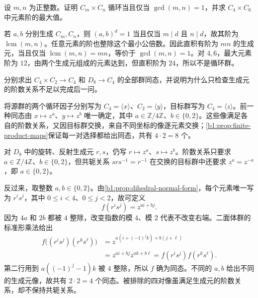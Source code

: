 \begin{exercise}\label{b1:ex:06-2}
	设 \(m,n\) 为正整数。证明 \(C_m\times C_n\) 循环当且仅当 \(\gcd(m,n)=1\)，并求 \(C_4\times C_6\) 中元素阶的最大值。
\end{exercise}
\begin{solution}
	若 \(a,b\) 分别生成 \(C_m,C_n\)，则 \((a,b)^d=1\) 当且仅当 \(m\mid d\) 且 \(n\mid d\)，故其阶为 \(\operatorname{lcm}(m,n)\)。任意元素的阶也整除这个最小公倍数。因此直积有阶为 \(mn\) 的生成元，当且仅当 \(\operatorname{lcm}(m,n)=mn\)，等价于 \(\gcd(m,n)=1\)。对 \(4,6\)，最大元素阶为 \(12\)，由两个生成元组成的元素达到，但直积阶为 \(24\)，所以不是循环群。
\end{solution}

\begin{exercise}\label{b1:ex:06-product-semidirect-homs}
	分别求出 \(C_4\times C_2\rightarrow C_4\) 和 \(D_8\rightarrow C_4\) 的全部群同态，并说明为什么只检查生成元的阶数关系不足以完成后一问。
\end{exercise}
\begin{solution}
	将源群的两个循环因子分别写为 \(C_4=\langle x\rangle\)、\(C_2=\langle y\rangle\)，目标群写为 \(C_4=\langle z\rangle\)。前一种同态由 \(x\mapsto z^a\)、\(y\mapsto z^b\) 唯一确定，其中 \(a\in\mathbb Z/4\mathbb Z\)、\(b\in\{0,2\}\)。这些像满足各自的阶数关系，又因目标群交换，来自不同坐标的像逐元素交换；\cref{b1:prop:finite-product-maps}保证每一对选择都给出同态，共有 \(4\cdot2=8\) 个。

	对 \(D_8\) 中的旋转、反射生成元 \(r,s\)，仍写 \(r\mapsto z^a\)、\(s\mapsto z^b\)。阶数关系只要求 \(a\in\mathbb Z/4\mathbb Z\)、\(b\in\{0,2\}\)，但共轭关系 \(srs^{-1}=r^{-1}\) 在交换的目标群中还要求 \(z^a=z^{-a}\)，即 \(a\in\{0,2\}\)。

	反过来，取整数 \(a,b\in\{0,2\}\)。由\cref{b1:prop:dihedral-normal-form}，每个元素唯一写为 \(r^is^j\)，其中 \(0\leq i<4\)、\(0\leq j<2\)，故可定义
	\[
		f(r^is^j)=z^{ai+bj}.
	\]
	因为 \(4a\) 和 \(2b\) 都被 \(4\) 整除，改变指数的模 \(4\)、模 \(2\) 代表不改变右端。二面体群的标准形乘法给出
	\[
		\begin{aligned}
			f\bigl((r^is^j)(r^ks^\ell)\bigr) &=z^{a(i+(-1)^jk)+b(j+\ell)}\\
			&=z^{ai+bj}z^{ak+b\ell} =f(r^is^j)f(r^ks^\ell).
		\end{aligned}
	\]
	第二行用到 \(a((-1)^j-1)k\) 被 \(4\) 整除，所以 \(f\) 确为同态。不同的 \(a,b\) 给出不同的生成元像，故共有 \(2\cdot2=4\) 个同态。被排除的四对像虽满足生成元的阶数关系，却不保持共轭关系。
\end{solution}

